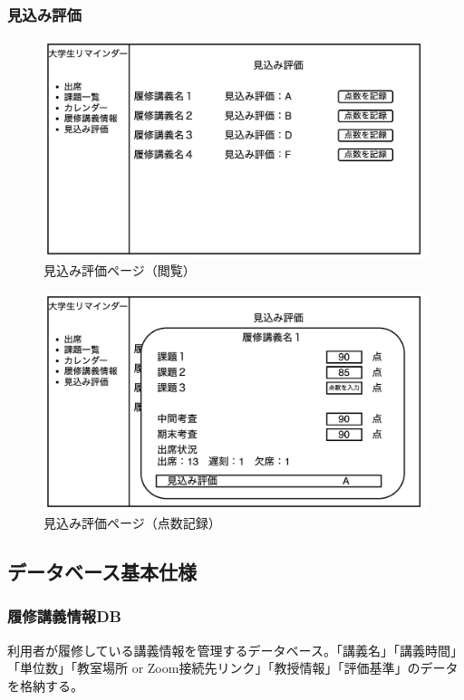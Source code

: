\documentclass[a4paper, 11pt, titlepage]{jsarticle}
\begin{document}
\clearpage

\subsubsection{見込み評価}
\begin{figure}[htbp]
\begin{center}
\includegraphics[width=120mm]{../img/Rating1.png}
\caption{見込み評価ページ（閲覧）}
\end{center}
\end{figure}
\begin{figure}[htbp]
\begin{center}
\includegraphics[width=120mm]{../img/Rating2.png}
\caption{見込み評価ページ（点数記録）}
\end{center}
\end{figure}

\subsection{データベース基本仕様}
\subsubsection{履修講義情報DB}
利用者が履修している講義情報を管理するデータベース。「講義名」「講義時間」「単位数」「教室場所 or Zoom接続先リンク」「教授情報」「評価基準」のデータを格納する。
\end{document}

